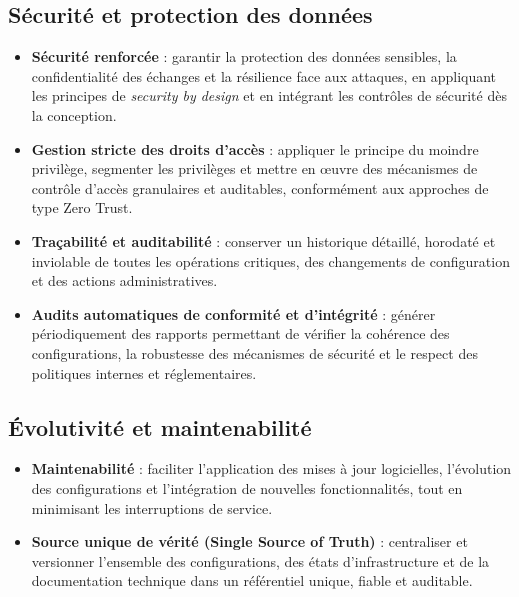 \subsection*{Sécurité et protection des données}

\begin{itemize}
	\item \textbf{Sécurité renforcée} : garantir la protection des données sensibles, la confidentialité des échanges et la résilience face aux attaques, en appliquant les principes de \emph{security by design} et en intégrant les contrôles de sécurité dès la conception.

	\item \textbf{Gestion stricte des droits d'accès} : appliquer le principe du moindre privilège, segmenter les privilèges et mettre en œuvre des mécanismes de contrôle d'accès granulaires et auditables, conformément aux approches de type Zero Trust.

	\item \textbf{Traçabilité et auditabilité} : conserver un historique détaillé, horodaté et inviolable de toutes les opérations critiques, des changements de configuration et des actions administratives.

	\item \textbf{Audits automatiques de conformité et d'intégrité} : générer périodiquement des rapports permettant de vérifier la cohérence des configurations, la robustesse des mécanismes de sécurité et le respect des politiques internes et réglementaires.
\end{itemize}

\subsection*{Évolutivité et maintenabilité}

\begin{itemize}
	\item \textbf{Maintenabilité} : faciliter l'application des mises à jour logicielles, l'évolution des configurations et l'intégration de nouvelles fonctionnalités, tout en minimisant les interruptions de service.

	\item \textbf{Source unique de vérité (Single Source of Truth)} : centraliser et versionner l'ensemble des configurations, des états d'infrastructure et de la documentation technique dans un référentiel unique, fiable et auditable.
\end{itemize}

